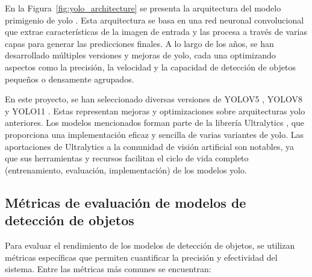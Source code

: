 \documentclass[11pt,spanish,listoffigures,listoftables]{tfgetsinf}
\begin{document}
En la Figura~\ref{fig:yolo_architecture} se presenta la arquitectura del modelo primigenio de \gls{yolo} \cite{redmon2016lookonceunifiedrealtime}. Esta arquitectura se basa en una red neuronal convolucional que extrae características de la imagen de entrada y las procesa a través de varias capas para generar las predicciones finales. A lo largo de los años, se han desarrollado múltiples versiones y mejoras de \gls{yolo}, cada una optimizando aspectos como la precisión, la velocidad y la capacidad de detección de objetos pequeños o densamente agrupados.

En este proyecto, se han seleccionado diversas versiones de YOLOV5 \cite{yolov5_ultralytics}, YOLOV8 \cite{yolov8_ultralytics} y YOLO11 \cite{yolo11_ultralytics}. Estas representan mejoras y optimizaciones sobre arquitecturas \gls{yolo} anteriores. Los modelos mencionados forman parte de la librería Ultralytics \cite{Jocher_Ultralytics_YOLO_2023}, que proporciona una implementación eficaz y sencilla de varias variantes de \gls{yolo}. Las aportaciones de Ultralytics a la comunidad de visión artificial son notables, ya que sus herramientas y recursos facilitan el ciclo de vida completo (entrenamiento, evaluación, implementación) de los modelos \gls{yolo}.

\subsection{Métricas de evaluación de modelos de detección de objetos} \label{sec:metricas_evaluacion}

Para evaluar el rendimiento de los modelos de detección de objetos, se utilizan métricas específicas que permiten cuantificar la precisión y efectividad del sistema. Entre las métricas más comunes se encuentran:
\end{document}
